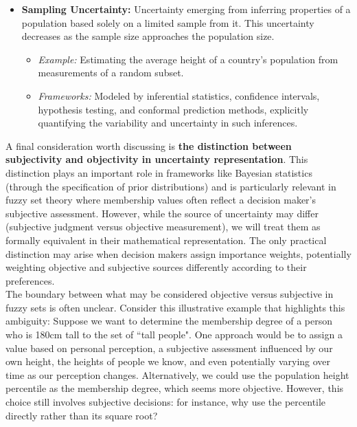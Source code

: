 \begin{itemize}
    \item \textbf{Sampling Uncertainty:} Uncertainty emerging from inferring properties of a population based solely on a limited sample from it. This uncertainty decreases as the sample size approaches the population size.
    \begin{itemize}
        \item \textit{Example:} Estimating the average height of a country's population from measurements of a random subset. 
        \item \textit{Frameworks:} Modeled by inferential statistics, confidence intervals, hypothesis testing, and conformal prediction methods, explicitly quantifying the variability and uncertainty in such inferences.
    \end{itemize}
\end{itemize}

A final consideration worth discussing is \textbf{the distinction between subjectivity and objectivity in uncertainty representation}. 
This distinction plays an important role in frameworks like Bayesian statistics (through the specification of prior distributions) and is particularly relevant in fuzzy set theory where membership values often reflect a decision maker's subjective assessment. However, while the source of uncertainty may differ (subjective judgment versus objective measurement), we will treat them as formally equivalent in their mathematical representation. The only practical distinction may arise when decision makers assign importance weights, potentially weighting objective and subjective sources differently according to their preferences.\\

The boundary between what may be considered objective versus subjective in fuzzy sets is often unclear. Consider this illustrative example that highlights this ambiguity:
Suppose we want to determine the membership degree of a person who is 180cm tall to the set of ``tall people". One approach would be to assign a value based on personal perception, a subjective assessment influenced by our own height, the heights of people we know, and even potentially varying over time as our perception changes. Alternatively, we could use the population height percentile as the membership degree, which seems more objective. However, this choice still involves subjective decisions: for instance, why use the percentile directly rather than its square root?\\